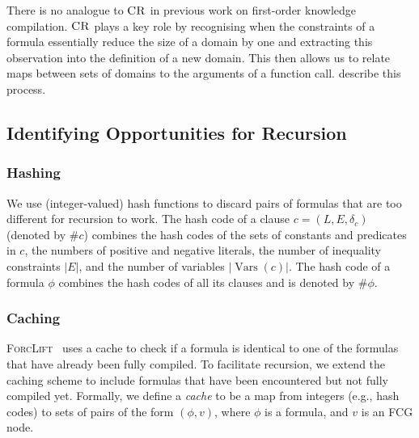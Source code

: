 \documentclass{article}
\DeclareMathOperator{\CR}{\textsc{CR}}
\DeclareMathOperator{\Vars}{Vars}
\begin{document}
There is no analogue to $\CR$ in previous work on first-order knowledge
compilation. $\CR$ plays a key role by recognising when the constraints of a
formula essentially reduce the size of a domain by one and extracting this
observation into the definition of a new domain. This then allows us to relate
maps between sets of domains to the arguments of a function call.
 describe this process.

\subsection{Identifying Opportunities for Recursion}\label{sec:ref}

\subsubsection{Hashing}
We use (integer-valued) hash functions to discard pairs of formulas that are too
different for recursion to work. The hash code of a clause
$c = (L, E, \delta_{c})$ (denoted by $\# c$) combines the hash codes of the sets
of constants and predicates in $c$, the numbers of positive and negative
literals, the number of inequality constraints $|E|$, and the number of
variables $|\Vars(c)|$. The hash code of a formula $\phi$ combines the hash
codes of all its clauses and is denoted by $\#\phi$.

\subsubsection{Caching}
\textsc{ForcLift}~\cite{DBLP:conf/ijcai/BroeckTMDR11} uses a cache to check if
a formula is identical to one of the formulas that have already been fully
compiled. To facilitate recursion, we extend the caching scheme to include
formulas that have been encountered but not fully compiled yet. Formally, we
define a \emph{cache} to be a map from integers (e.g., hash codes) to sets of
pairs of the form $(\phi, v)$, where $\phi$ is a formula, and $v$ is an FCG
node.
\end{document}
